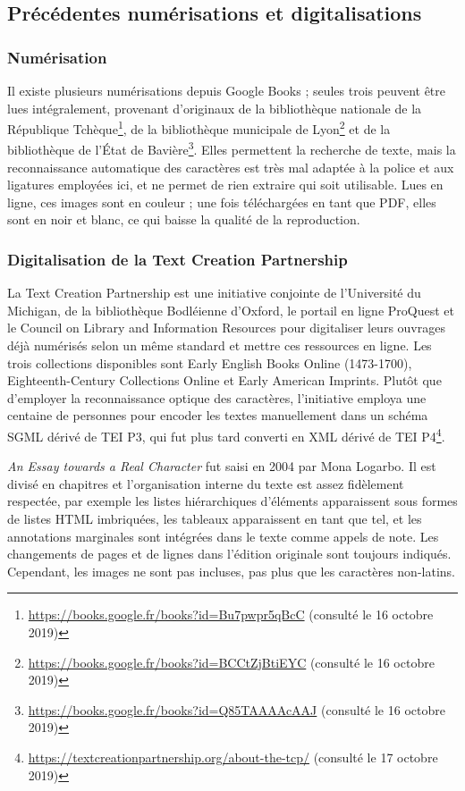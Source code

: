 \subsection{Précédentes numérisations et digitalisations}\label{WilkinsChoixNum}
\subsubsection{Numérisation}
Il existe plusieurs numérisations depuis Google Books ; seules trois peuvent être lues intégralement, provenant d'originaux de la bibliothèque nationale de la République Tchèque\footnote{\url{https://books.google.fr/books?id=Bu7pwpr5qBcC} (consulté le 16 octobre 2019)}, de la bibliothèque municipale de Lyon\footnote{\url{https://books.google.fr/books?id=BCCtZjBtiEYC} (consulté le 16 octobre 2019)} et de la bibliothèque de l'État de Bavière\footnote{\url{https://books.google.fr/books?id=Q85TAAAAcAAJ} (consulté le 16 octobre 2019)}.
Elles permettent la recherche de texte, mais la reconnaissance automatique des caractères est très mal adaptée à la police et aux ligatures employées ici, et ne permet de rien extraire qui soit utilisable.
Lues en ligne, ces images sont en couleur ; une fois téléchargées en tant que PDF, elles sont en noir et blanc, ce qui baisse la qualité de la reproduction.
\subsubsection{Digitalisation de la Text Creation Partnership}
La Text Creation Partnership est une initiative conjointe de l'Université du Michigan, de la bibliothèque Bodléienne d'Oxford, le portail en ligne ProQuest et le Council on Library and Information Resources pour digitaliser leurs ouvrages déjà numérisés selon un même standard et mettre ces ressources en ligne.
Les trois collections disponibles sont Early English Books Online (1473-1700), Eighteenth-Century Collections Online et Early American Imprints.
Plutôt que d'employer la reconnaissance optique des caractères, l'initiative employa une centaine de personnes pour encoder les textes manuellement dans un schéma SGML dérivé de TEI P3, qui fut plus tard converti en XML dérivé de TEI P4\footnote{\url{https://textcreationpartnership.org/about-the-tcp/} (consulté le 17 octobre 2019)}.

\emph{An Essay towards a Real Character} fut saisi en 2004 par Mona Logarbo.
Il est divisé en chapitres et l'organisation interne du texte est assez fidèlement respectée, par exemple les listes hiérarchiques d'éléments apparaissent sous formes de listes HTML imbriquées, les tableaux apparaissent en tant que tel, et les annotations marginales sont intégrées dans le texte comme appels de note.
Les changements de pages et de lignes dans l'édition originale sont toujours indiqués.
Cependant, les images ne sont pas incluses, pas plus que les caractères non-latins.

